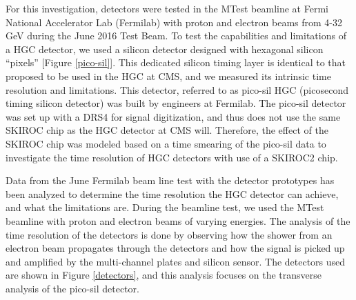 \documentclass[twocolumn,aps,prd,reprint]{revtex4-1}
\begin{document}
For this investigation, detectors were tested in the MTest beamline at Fermi National Accelerator Lab (Fermilab) with proton and electron beams from 4-32 GeV during the June 2016 Test Beam. To test the capabilities and limitations of a HGC detector, we used a silicon detector designed with hexagonal silicon ``pixels'' [Figure \ref{pico-sil}]. This dedicated silicon timing layer is identical to that proposed to be used in the HGC at CMS, and we measured its intrinsic time resolution and limitations. This detector, referred to as pico-sil HGC (picosecond timing silicon detector) was built by engineers at Fermilab. The pico-sil detector was set up with a DRS4 for signal digitization, and thus does not use the same SKIROC chip as the HGC detector at CMS will. Therefore, the effect of the SKIROC chip was modeled based on a time smearing of the pico-sil data to investigate the time resolution of HGC detectors with use of a SKIROC2 chip.

Data from the June Fermilab beam line test with the detector prototypes has been analyzed to determine the time resolution the HGC detector can achieve, and what the limitations are. During the beamline test, we used the MTest beamline with proton and electron beams of varying energies. The analysis of the time resolution of the detectors is done by observing how the shower from an electron beam propagates through the detectors and how the signal is picked up and amplified by the multi-channel plates and silicon sensor. The detectors used are shown in Figure \ref{detectors}, and this analysis focuses on the transverse analysis of the pico-sil detector.
\end{document}
